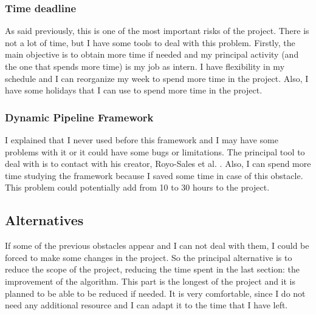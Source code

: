 \subsubsection*{Time deadline}
As said previously, this is one of the most important risks of the project. There is not a lot of time, but I have some tools to deal with this problem.
Firstly, the main objective is to obtain more time if needed and my principal activity (and the one that spends more time) is my job as intern.
I have flexibility in my schedule and I can reorganize my week to spend more time in the project.
Also, I have some holidays that I can use to spend more time in the project.
\subsubsection*{Dynamic Pipeline Framework}
I explained that I never used before this framework and I may have some problems with it or it could have some bugs or limitations.
The principal tool to deal with is to contact with his creator, Royo-Sales et al. \cite{royo_sales_algorithm_2021}. Also, I can spend more time studying the framework because I saved some time in case of this obstacle.
This problem could potentially add from 10 to 30 hours to the project.
\subsection{Alternatives}
If some of the previous obstacles appear and I can not deal with them, I could be forced to make some changes in the project.
So the principal alternative is to reduce the scope of the project, reducing the time spent in the last section: the improvement of the algorithm.
This part is the longest of the project and it is planned to be able to be reduced if needed.
It is very comfortable, since I do not need any additional resource and I can adapt it to the time that I have left.
